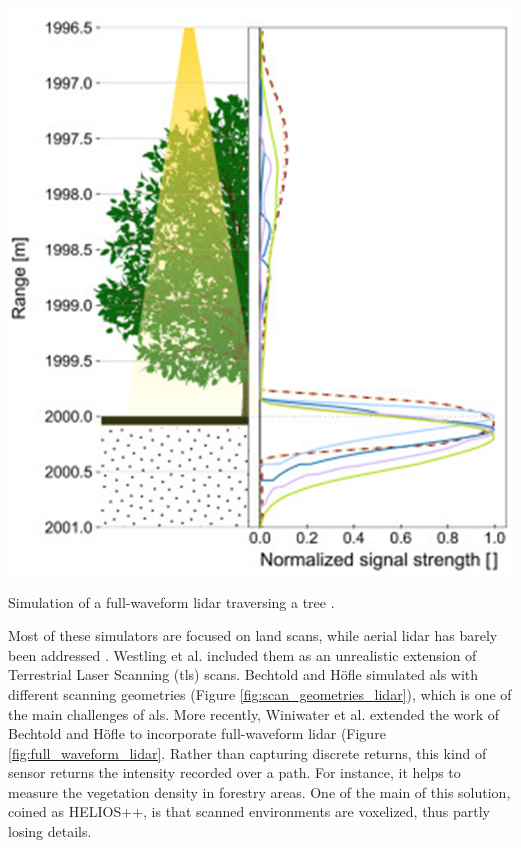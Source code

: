 \begin{marginfigure}[.0cm]
	\includegraphics{figs/context/waveform_lidar.png}
	\caption{Simulation of a full-waveform \acrshort{lidar} traversing a tree \cite{winiwarter_virtual_2022}.}
	\label{fig:full_waveform_lidar}
\end{marginfigure}
Most of these simulators are focused on land scans, while aerial \acrshort{lidar} has barely been addressed  \cite{winiwarter_virtual_2022}. Westling et al. \cite{westling_simtreels_2020} included them as an unrealistic extension of Terrestrial Laser Scanning (\acrshort{tls}) scans. Bechtold and Höfle \cite{bechtold_helios_2016} simulated \acrshort{als} with different scanning geometries (Figure \ref{fig:scan_geometries_lidar}), which is one of the main challenges of \acrshort{als}. More recently, Winiwater et al. \cite{winiwarter_virtual_2022} extended the work of Bechtold and Höfle to incorporate full-waveform \acrshort{lidar} (Figure \ref{fig:full_waveform_lidar}. Rather than capturing discrete returns, this kind of sensor returns the intensity recorded over a path. For instance, it helps to measure the vegetation density in forestry areas. One of the main of this solution, coined as HELIOS++, is that scanned environments are voxelized, thus partly losing details. 

